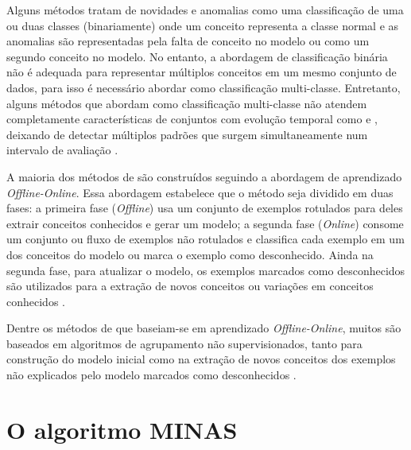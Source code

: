 
Alguns métodos tratam de novidades e anomalias como uma classificação de uma
ou duas classes (binariamente) onde um conceito representa a classe normal e
as anomalias são representadas pela falta de conceito no modelo ou
como um segundo conceito no modelo.
No entanto, a abordagem de classificação binária não é adequada para representar
múltiplos conceitos em um mesmo conjunto de dados, para isso é necessário abordar
\nd como classificação multi-classe.
Entretanto, alguns métodos que abordam \nd como classificação multi-classe não
atendem completamente características de conjuntos com evolução temporal
como \evolution e \drift, deixando de detectar múltiplos padrões que surgem
simultaneamente num intervalo de avaliação \cite{Faria2016nd,Gama2010}.

A maioria dos métodos de \nd são construídos seguindo a abordagem de aprendizado
\emph{Offline-Online}. Essa abordagem estabelece que o método seja dividido em
duas fases:
a primeira fase (\emph{Offline}) usa um conjunto de exemplos rotulados para
deles extrair conceitos conhecidos e gerar um modelo;
a segunda fase (\emph{Online}) consome um conjunto ou fluxo de exemplos não
rotulados e classifica cada exemplo em um dos conceitos do modelo ou marca o
exemplo como desconhecido.
Ainda na segunda fase, para atualizar o modelo, os exemplos marcados como
desconhecidos são utilizados para a extração de novos conceitos ou variações em
conceitos conhecidos \cite{Gama2010}.

Dentre os métodos de \nd que baseiam-se em aprendizado \emph{Offline-Online},
muitos são baseados em algoritmos de agrupamento não supervisionados, tanto
para construção do modelo inicial como na extração de novos conceitos dos
exemplos não explicados pelo modelo marcados como desconhecidos
\cite{Spinosa2009ollinda,Masud2010ECSMiner,Faria2013}.





\section{O algoritmo MINAS}\label{sec:minas-og}

